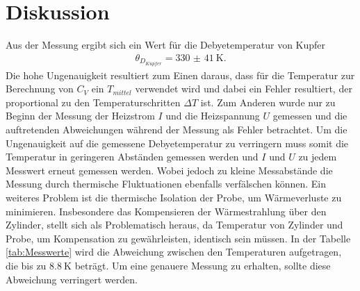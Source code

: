 \section{Diskussion}
\label{sec:Diskussion}

Aus der Messung ergibt sich ein Wert für die Debyetemperatur von Kupfer
\begin{align}
\theta_{D_{Kupfer}} = \SI{330(41)}{\kelvin}.
\end{align}
Die hohe Ungenauigkeit resultiert zum Einen daraus, dass für die Temperatur zur Berechnung von
$C_V$ ein $T_{mittel}$ verwendet wird und dabei ein Fehler resultiert, der proportional
zu den Temperaturschritten $\Delta T$ ist. Zum Anderen wurde
nur zu Beginn der Messung der Heizstrom $I$ und die Heizspannung $U$
gemessen und die auftretenden Abweichungen während der Messung als Fehler betrachtet.
Um die Ungenauigkeit auf die gemessene Debyetemperatur zu verringern muss somit die
Temperatur in geringeren Abständen gemessen werden und $I$ und $U$ zu jedem
Messwert erneut gemessen werden. Wobei jedoch zu kleine
Messabstände die Messung durch thermische Fluktuationen ebenfalls verfälschen können.
Ein weiteres Problem ist die thermische Isolation der Probe, um Wärmeverluste zu minimieren. Insbesondere das Kompensieren der Wärmestrahlung über
den Zylinder, stellt sich als Problematisch heraus, da Temperatur von Zylinder und Probe, um Kompensation zu gewährleisten, identisch sein müssen.
In der Tabelle \ref{tab:Messwerte} wird die Abweichung zwischen den Temperaturen aufgetragen, die bis zu $\SI{8.8}{\kelvin}$
beträgt. Um eine genauere Messung zu erhalten, sollte diese Abweichung verringert werden.

